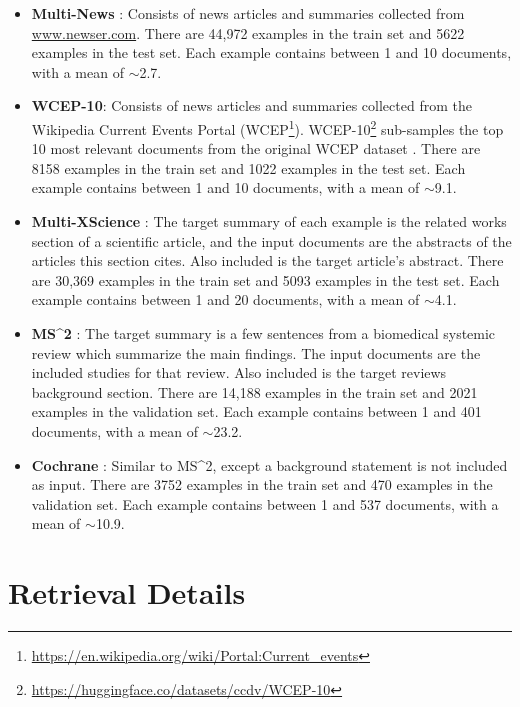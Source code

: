 \documentclass[11pt]{article}
\newcommand\mstoo{{MS\^{}2}\xspace}
\begin{document}
\begin{itemize}
    \item \textbf{Multi-News} \citep{fabbri-etal-2019-multi}: Consists of news articles and summaries collected from \url{www.newser.com}. There are 44,972 examples in the train set and 5622 examples in the test set. Each example contains between 1 and 10 documents, with a mean of \(\sim\)2.7.
    \item \textbf{WCEP-10}: Consists of news articles and summaries collected from the Wikipedia Current Events Portal (WCEP\footnote{\url{https://en.wikipedia.org/wiki/Portal:Current_events}}). WCEP-10\footnote{\label{wcep-10}\url{https://huggingface.co/datasets/ccdv/WCEP-10}} sub-samples the top 10 most relevant documents from the original WCEP dataset \citep{gholipour-ghalandari-etal-2020-large}. There are 8158 examples in the train set and 1022 examples in the test set. Each example contains between 1 and 10 documents, with a mean of \(\sim\)9.1.
    \item \textbf{Multi-XScience} \citep{lu-etal-2020-multi-xscience}: The target summary of each example is the related works section of a scientific article, and the input documents are the abstracts of the articles this section cites. Also included is the target article's abstract. There are 30,369 examples in the train set and 5093 examples in the test set. Each example contains between 1 and 20 documents, with a mean of \(\sim\)4.1.
    \item \textbf{\mstoo} \citep{deyoung-etal-2021-ms}: The target summary is a few sentences from a biomedical systemic review which summarize the main findings. The input documents are the included studies for that review. Also included is the target reviews background section. There are 14,188 examples in the train set and 2021 examples in the validation set. Each example contains between 1 and 401 documents, with a mean of \(\sim\)23.2.
    \item \textbf{Cochrane} \citep{cochrane}: Similar to \mstoo, except a background statement is not included as input. There are 3752 examples in the train set and 470 examples in the validation set. Each example contains between 1 and 537 documents, with a mean of \(\sim\)10.9.
\end{itemize}

\section{Retrieval Details}
\label{appendix:retrieval}
\end{document}
